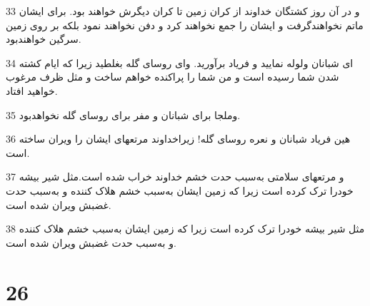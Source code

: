 \par 33 و در آن روز کشتگان خداوند از کران زمین تا کران دیگرش خواهند بود. برای ایشان ماتم نخواهندگرفت و ایشان را جمع نخواهند کرد و دفن نخواهند نمود بلکه بر روی زمین سرگین خواهندبود.
\par 34 ‌ای شبانان ولوله نمایید و فریاد برآورید. وای روسای گله بغلطید زیرا که ایام کشته شدن شما رسیده است و من شما را پراکنده خواهم ساخت و مثل ظرف مرغوب خواهید افتاد.
\par 35 وملجا برای شبانان و مفر برای روسای گله نخواهدبود.
\par 36 هین فریاد شبانان و نعره روسای گله! زیراخداوند مرتعهای ایشان را ویران ساخته است.
\par 37 و مرتعهای سلامتی به‌سبب حدت خشم خداوند خراب شده است.مثل شیر بیشه خودرا ترک کرده است زیرا که زمین ایشان به‌سبب خشم هلاک کننده و به‌سبب حدت غضبش ویران شده است.
\par 38 مثل شیر بیشه خودرا ترک کرده است زیرا که زمین ایشان به‌سبب خشم هلاک کننده و به‌سبب حدت غضبش ویران شده است.
 
\chapter{26}

